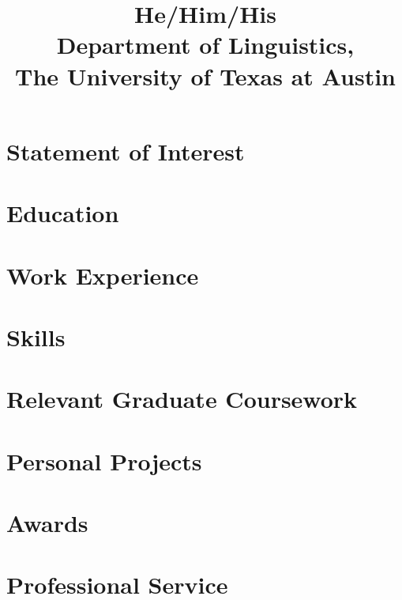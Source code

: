 \documentclass[11pt,a4paper]{mycv}
\title{He/Him/His\\Department of Linguistics,\\The University of Texas at Austin}
\begin{document}
\makecvtitle

\section{Statement of Interest}


\section{Education}


\vspace{0.5mm}

\section{Work Experience}


\begingroup
\setlength\bibitemsep{0.5ex}
\printbibliography[title=Select papers, nottype=unpublished]
\endgroup

\section{Skills}


\section{Relevant Graduate Coursework}


\section{Personal Projects}


\section{Awards}


\section{Professional Service}

\end{document}
